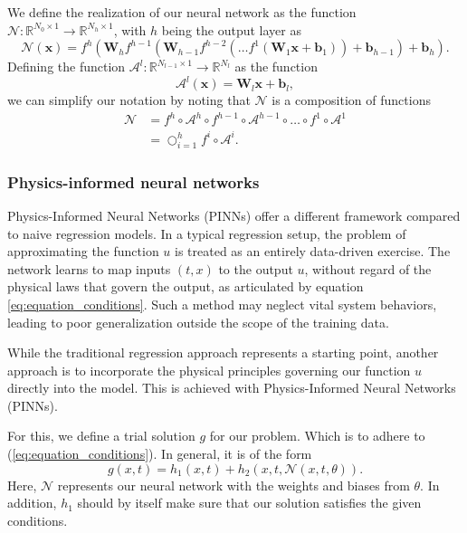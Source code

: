 \documentclass{article}
\theoremstyle{definition}
\begin{document}
We define the realization of our neural network as the function $\mathcal{N}: \mathbb{R}^{N_0 \times 1} \to \mathbb{R}^{N_h \times 1}$, with $h$ being the output layer as
\begin{equation*}
    \mathcal{N}(\boldsymbol{x}) =
    f^h\left(
    \mathbf{W}_h f^{h-1} \left(
    \mathbf{W}_{h-1}f^{h-2} \left(\ldots f^1\left( \mathbf{W}_1 \boldsymbol{x} + \mathbf{b}_1 \right) \right)
    + \mathbf{b}_{h-1} \right) 
    + \mathbf{b}_h \right).
\end{equation*}
Defining the function $\mathcal{A}^l: \mathbb{R}^{N_{l-1} \times 1} \to \mathbb{R}^{N_{l}}$ as the function
\begin{equation*}
    \mathcal{A}^l (\boldsymbol{x}) = \mathbf{W}_l \boldsymbol{x} + \mathbf{b}_l,
\end{equation*}
we can simplify our notation by noting that $\mathcal{N}$ is a composition of functions
\begin{align*}
    \mathcal{N} &= f^h \circ \mathcal{A}^h \circ f^{h-1} \circ \mathcal{A}^{h-1} \circ \ldots \circ f^1 \circ \mathcal{A}^1 \\
    &= \bigcirc_{i = 1}^h f^{i} \circ \mathcal{A}^{i}.
\end{align*}



\subsubsection{Physics-informed neural networks}

Physics-Informed Neural Networks (PINNs) offer a different framework compared to naive regression models. In a typical regression setup, the problem of approximating the function $u$ is treated as an entirely data-driven exercise. The network learns to map inputs $(t, x)$ to the output $u$, without regard of the physical laws that govern the output, as articulated by equation \eqref{eq:equation_conditions}. Such a method may neglect vital system behaviors, leading to poor generalization outside the scope of the training data.

While the traditional regression approach represents a starting point, another approach is to incorporate the physical principles governing our function $u$ directly into the model. This is achieved with Physics-Informed Neural Networks (PINNs).

For this, we define a trial solution $g$ for our problem. Which is to adhere to (\ref{eq:equation_conditions}). In general, it is of the form
\begin{equation*}
    g(x, t) = h_1(x, t) + h_2(x, t, \mathcal{N}(x, t, \theta)).
\end{equation*}
Here, $\mathcal{N}$ represents our neural network with the weights and biases from $\theta$. In addition, $h_1$ should by itself make sure that our solution satisfies the given conditions.
\end{document}
